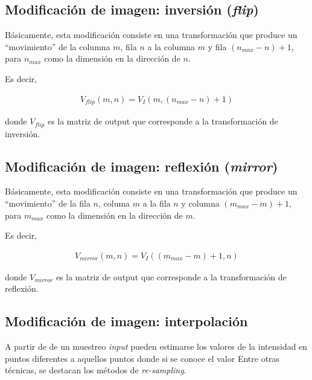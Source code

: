 \subsection{Modificaci\'on de imagen: inversi\'on (\textit{flip})}

B\'asicamente, esta modificaci\'on consiste en una transformaci\'on que 
produce un  ``movimiento'' de la columna $m$, fila $n$ a la columna $m$ y 
fila $(n_{max} - n) + 1$, para $n_{max}$ como la dimensi\'on en la 
direcci\'on de $n$.
%

%
Es decir,

\begin{eqnarray}
	V_{flip}(m, n) = V_{I} (m, (n_{max} - n) + 1)
\label{EqXXVII}
\end{eqnarray}

donde $V_{flip}$ es la matriz de output que corresponde a la transformaci\'on de inversi\'on.

\subsection{Modificaci\'on de imagen: reflexi\'on (\textit{mirror})}

B\'asicamente, esta modificaci\'on consiste en una transformaci\'on que produce un  ``movimiento'' de la fila $n$, columa $m$ a la fila $n$ y 
columna $(m_{max} - m) + 1$, para $m_{max}$ como la dimensi\'on en la 
direcci\'on de $m$.
%

%
Es decir,

\begin{eqnarray}
	V_{mirror}(m, n) = V_{I} ((m_{max}  - m) + 1, n)
\label{EqXXVIII}
\end{eqnarray}

donde $V_{mirror}$ es la matriz de output que corresponde a la transformaci\'on de reflexi\'on.

\subsection{Modificaci\'on de imagen: interpolaci\'on}

A partir de de un muestreo \textit{input} pueden estimarse los valores de la intensidad en puntos diferentes a aquellos puntos donde si se conoce el valor 
%
Entre otras t\'ecnicas, se destacan los m\'etodos de \textit{re-sampling}.
%

